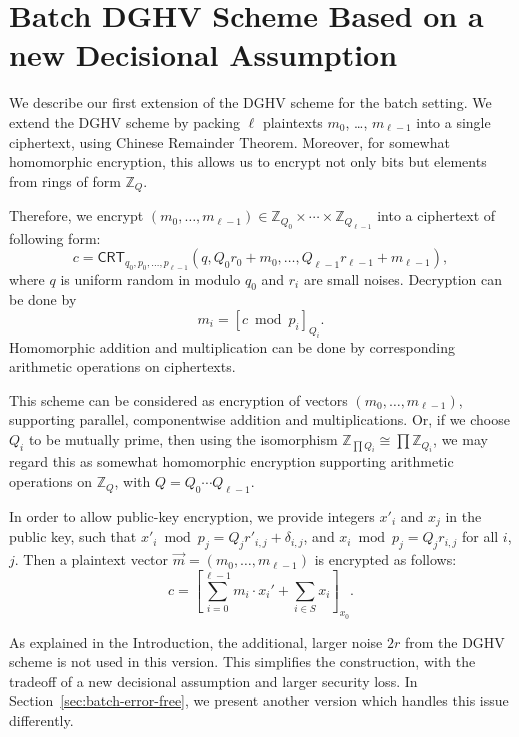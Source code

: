 \documentclass[11pt]{llncs}
\newcommand{\Z}{{\mathbb Z}}
\newcommand*{\crt}{\ensuremath{\mathsf{CRT}}}
\begin{document}
\section{Batch DGHV Scheme Based on a new Decisional Assumption}\label{sec:batch-decisional}

%

We describe our first extension of the DGHV scheme for the batch setting.  We extend the DGHV scheme
by packing $\ell$ plaintexts $m_0$, \dots, $m_{\ell-1}$ into a single ciphertext, using Chinese Remainder
Theorem.  Moreover, for somewhat homomorphic encryption, this allows us to encrypt not only bits
but elements from rings of form $\Z_Q$.

Therefore, we encrypt $(m_0, \dots, m_{\ell-1})\in\Z_{Q_0}\times\cdots\times\Z_{Q_{\ell-1}}$ into a ciphertext
of following form:
\[
c=\crt_{q_0,p_0,\ldots,p_{\ell-1}}(q, Q_0 r_0+m_0,\ldots,Q_{\ell-1}r_{\ell-1}+m_{\ell-1}),
\]
where $q$ is uniform random in modulo $q_0$ and $r_i$ are small noises.  Decryption can be done by
\[
m_i=[c\bmod{p_i}]_{Q_i}.
\]
Homomorphic addition and multiplication can be done by corresponding arithmetic operations on ciphertexts.

This scheme can be considered as encryption of vectors $(m_0, \dots, m_{\ell-1})$, supporting parallel, componentwise
addition and multiplications.  Or, if we choose $Q_i$ to be mutually prime, then using the isomorphism 
$\Z_{\prod Q_i}\cong\prod\Z_{Q_i}$, we may regard this as somewhat homomorphic encryption supporting arithmetic operations
on $\Z_Q$, with $Q=Q_0\cdots Q_{\ell-1}$.

In order to allow public-key encryption, we provide integers $x'_i$ and $x_j$ in the public key, such that $x'_i\bmod{p_j}=Q_{j}r'_{i,j}+\delta_{i,j}$, and $x_i\bmod{p_j}=Q_{j}r_{i,j}$ for all $i$, $j$.  Then a plaintext vector $\vec{m}=(m_0, \dots, m_{\ell-1})$ is encrypted as follows:
\[
c=\left[\sum_{i=0}^{\ell-1}m_i\cdot x_i'+\sum_{i\in S} x_i\right]_{x_0}.
\]

As explained in the Introduction, the additional, larger noise $2r$ from the DGHV scheme is not used in this version.
This simplifies the construction, with the tradeoff of a new decisional assumption and larger security loss.  
In Section~\ref{sec:batch-error-free}, we present another version which handles this issue differently.
\end{document}
